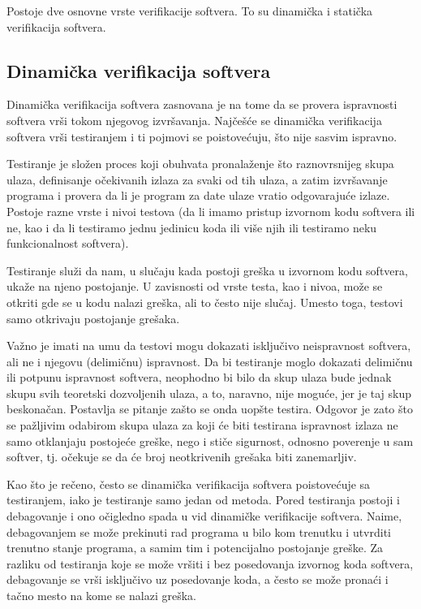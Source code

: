 \documentclass[a4paper]{article}
\begin{document}
\par Postoje dve osnovne vrste verifikacije softvera. To su dinamička i statička verifikacija softvera.

\subsection{Dinamička verifikacija softvera}
\label{subsec:dinamicka}

\par Dinamička verifikacija softvera zasnovana je na tome da se provera ispravnosti softvera vrši tokom njegovog izvršavanja. Najčešće se dinamička verifikacija softvera vrši testiranjem i ti pojmovi se poistovećuju, što nije sasvim ispravno.

\par Testiranje je složen proces koji obuhvata pronalaženje što raznovrsnijeg skupa ulaza, definisanje očekivanih izlaza za svaki od tih ulaza, a zatim izvršavanje programa i provera da li je program za date ulaze vratio odgovarajuće izlaze. Postoje razne vrste i nivoi testova (da li imamo pristup izvornom kodu softvera ili ne, kao i da li testiramo jednu jedinicu koda ili više njih ili testiramo neku funkcionalnost softvera).

\par Testiranje služi da nam, u slučaju kada postoji greška u izvornom kodu softvera, ukaže na njeno postojanje. U zavisnosti od vrste testa, kao i nivoa, može se otkriti gde se u kodu nalazi greška, ali to često nije slučaj. Umesto toga, testovi samo otkrivaju postojanje grešaka.

\par Važno je imati na umu da testovi mogu dokazati isključivo neispravnost softvera, ali ne i njegovu (delimičnu) ispravnost. Da bi testiranje moglo dokazati delimičnu ili potpunu ispravnost softvera, neophodno bi bilo da skup ulaza bude jednak skupu svih teoretski dozvoljenih ulaza, a to, naravno, nije moguće, jer je taj skup beskonačan. Postavlja se pitanje zašto se onda uopšte testira. Odgovor je zato što se pažljivim odabirom skupa ulaza za koji će biti testirana ispravnost izlaza ne samo otklanjaju postojeće greške, nego i stiče sigurnost, odnosno poverenje u sam softver, tj. očekuje se da će broj neotkrivenih grešaka biti zanemarljiv.

\par Kao što je rečeno, često se dinamička verifikacija softvera poistovećuje sa testiranjem, iako je testiranje samo jedan od metoda. Pored testiranja postoji i debagovanje i ono očigledno spada u vid dinamičke verifikacije softvera. Naime, debagovanjem se može prekinuti rad programa u bilo kom trenutku i utvrditi trenutno stanje programa, a samim tim i potencijalno postojanje greške. Za razliku od testiranja koje se može vršiti i bez posedovanja izvornog koda softvera, debagovanje se vrši isključivo uz posedovanje koda, a često se može pronaći i tačno mesto na kome se nalazi greška.
\end{document}
